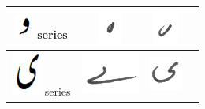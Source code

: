 \documentclass[a4paper,conference]{IEEEtran}
\begin{document}
\begin{table}[h]
\begin{tabular}{@{}cccc@{}}
\hline
\includegraphics[scale=0.15]{wao_orig} series & \includegraphics[scale=0.15]{178} & \includegraphics[scale=0.15]{179} & \\
\hline
\includegraphics[scale=0.15]{choti_ye_orig} series & \includegraphics[scale=0.15]{180} & \includegraphics[scale=0.15]{181} &  \\
\hline
\end{tabular}
\end{table}
\end{document}

